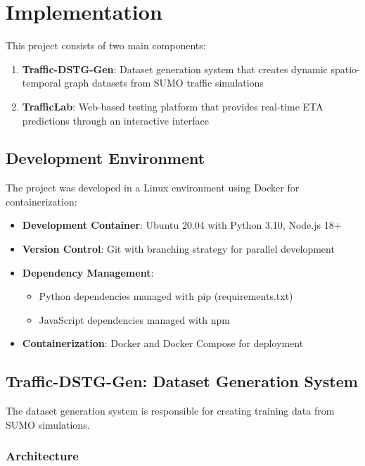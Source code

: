 \section{Implementation}

This project consists of two main components:

\begin{enumerate}
    \item \textbf{Traffic-DSTG-Gen}: Dataset generation system that creates dynamic spatio-temporal graph datasets from SUMO traffic simulations
    \item \textbf{TrafficLab}: Web-based testing platform that provides real-time ETA predictions through an interactive interface
\end{enumerate}

\subsection{Development Environment}

The project was developed in a Linux environment using Docker for containerization:

\begin{itemize}
    \item \textbf{Development Container}: Ubuntu 20.04 with Python 3.10, Node.js 18+
    \item \textbf{Version Control}: Git with branching strategy for parallel development
    \item \textbf{Dependency Management}: 
    \begin{itemize}
        \item Python dependencies managed with pip (requirements.txt)
        \item JavaScript dependencies managed with npm
    \end{itemize}
    \item \textbf{Containerization}: Docker and Docker Compose for deployment
\end{itemize}

\subsection{Traffic-DSTG-Gen: Dataset Generation System}

The dataset generation system is responsible for creating training data from SUMO simulations.

\subsubsection{Architecture}

